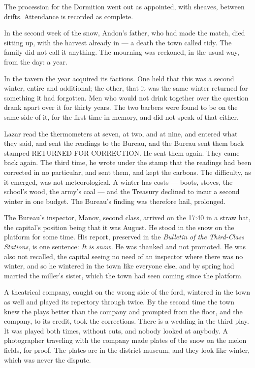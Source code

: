 \documentclass[11pt]{article}
\begin{document}
The procession for the Dormition went out as appointed, with sheaves, between drifts. Attendance is recorded as complete.

In the second week of the snow, Andon's father, who had made the match, died sitting up, with the harvest already in — a death the town called tidy. The family did not call it anything. The mourning was reckoned, in the usual way, from the day: a year.

In the tavern the year acquired its factions. One held that this was a second winter, entire and additional; the other, that it was the same winter returned for something it had forgotten. Men who would not drink together over the question drank apart over it for thirty years. The two barbers were found to be on the same side of it, for the first time in memory, and did not speak of that either.

Lazar read the thermometers at seven, at two, and at nine, and entered what they said, and sent the readings to the Bureau, and the Bureau sent them back stamped RETURNED FOR CORRECTION. He sent them again. They came back again. The third time, he wrote under the stamp that the readings had been corrected in no particular, and sent them, and kept the carbons. The difficulty, as it emerged, was not meteorological. A winter has costs — boots, stoves, the school's wood, the army's coal — and the Treasury declined to incur a second winter in one budget. The Bureau's finding was therefore hail, prolonged.

The Bureau's inspector, Manov, second class, arrived on the 17:40 in a straw hat, the capital's position being that it was August. He stood in the snow on the platform for some time. His report, preserved in the \emph{Bulletin of the Third-Class Stations}, is one sentence: \emph{It is snow.} He was thanked and not promoted. He was also not recalled, the capital seeing no need of an inspector where there was no winter, and so he wintered in the town like everyone else, and by spring had married the miller's sister, which the town had seen coming since the platform.

A theatrical company, caught on the wrong side of the ford, wintered in the town as well and played its repertory through twice. By the second time the town knew the plays better than the company and prompted from the floor, and the company, to its credit, took the corrections. There is a wedding in the third play. It was played both times, without cuts, and nobody looked at anybody. A photographer traveling with the company made plates of the snow on the melon fields, for proof. The plates are in the district museum, and they look like winter, which was never the dispute.
\end{document}
